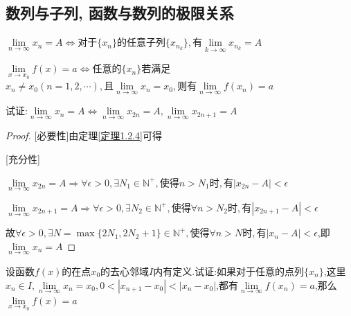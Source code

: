 \subsection{数列与子列, 函数与数列的极限关系}

\begin{theorem}[数列与子列]\label{定理1.2.4}
    $\lim \limits_{n \to \infty} x_n=A \Longleftrightarrow \mbox{对于}\{x_n\}\mbox{的任意子列}\{x_{n_k}\},\mbox{有}\lim \limits_{k \to \infty} x_{n_k}=A$
\end{theorem}

\begin{theorem}[海涅定理]
    $\lim \limits_{x \to x_0} f(x)=a \Longleftrightarrow \mbox{任意的}\{x_n\}$若满足$x_n\ne x_0(n=1,2,\cdots),\mbox{且}\lim \limits_{n \to \infty} x_n=x_0,\mbox{则有}\lim \limits_{n \to \infty} f(x_n)=a$
\end{theorem}

\begin{example}
    试证:$\lim \limits_{n \to \infty} x_n=A \Longleftrightarrow \lim \limits_{n \to \infty} x_{2n}=A,\lim \limits_{n \to \infty} x_{2n+1}=A$
\end{example}

\begin{proof}

    [必要性]由定理\ref{定理1.2.4}可得

    [充分性]

    $\lim \limits_{n \to \infty} x_{2n}=A \Longrightarrow \forall \epsilon>0,\exists N_1\in \mathbb{N}^+,\mbox{使得}n>N_1\mbox{时},\mbox{有}|x_{2n}-A|<\epsilon$

    $\lim \limits_{n \to \infty} x_{2n+1}=A \Longrightarrow \forall \epsilon>0,\exists N_2\in \mathbb{N}^+,\mbox{使得}\forall n>N_2\mbox{时},\mbox{有}|x_{2n+1}-A|<\epsilon$

    故$\forall \epsilon>0,\exists N=\max\{2N_1,2N_2+1\}\in \mathbb{N}^+,\mbox{使得}\forall n>N\mbox{时},\mbox{有}|x_n-A|<\epsilon$,即$\lim \limits_{n \to \infty} x_n=A$
\end{proof}

\begin{example}
    设函数$f(x)$的在点$x_0$的去心邻域$I$内有定义.试证:如果对于任意的点列$\{x_n\}$,这里$x_n\in I,\lim \limits_{n \to \infty} x_n = x_0,0<|x_{n+1}-x_0|<|x_n-x_0|$,都有$\lim \limits_{n \to \infty} f(x_n)=a$,那么$\lim \limits_{x \to x_0} f(x)=a$
\end{example}

